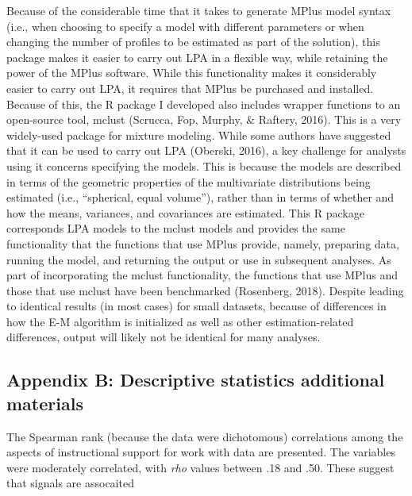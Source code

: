 \documentclass[]{book}
\theoremstyle{definition}
\theoremstyle{definition}
\theoremstyle{definition}
\theoremstyle{remark}
\begin{document}
Because of the considerable time that it takes to generate MPlus model
syntax (i.e., when choosing to specify a model with different parameters
or when changing the number of profiles to be estimated as part of the
solution), this package makes it easier to carry out LPA in a flexible
way, while retaining the power of the MPlus software. While this
functionality makes it considerably easier to carry out LPA, it requires
that MPlus be purchased and installed. Because of this, the R package I
developed also includes wrapper functions to an open-source tool, mclust
(Scrucca, Fop, Murphy, \& Raftery, 2016). This is a very widely-used
package for mixture modeling. While some authors have suggested that it
can be used to carry out LPA (Oberski, 2016), a key challenge for
analysts using it concerns specifying the models. This is because the
models are described in terms of the geometric properties of the
multivariate distributions being estimated (i.e., ``spherical, equal
volume''), rather than in terms of whether and how the means, variances,
and covariances are estimated. This R package corresponds LPA models to
the mclust models and provides the same functionality that the functions
that use MPlus provide, namely, preparing data, running the model, and
returning the output or use in subsequent analyses. As part of
incorporating the mclust functionality, the functions that use MPlus and
those that use mclust have been benchmarked (Rosenberg, 2018). Despite
leading to identical results (in most cases) for small datasets, because
of differences in how the E-M algorithm is initialized as well as other
estimation-related differences, output will likely not be identical for
many analyses.

\subsection{Appendix B: Descriptive statistics additional
materials}\label{appendix-b-descriptive-statistics-additional-materials}

The Spearman rank (because the data were dichotomous) correlations among
the aspects of instructional support for work with data are presented.
The variables were moderately correlated, with \emph{rho} values between
.18 and .50. These suggest that signals are assocaited
\end{document}
